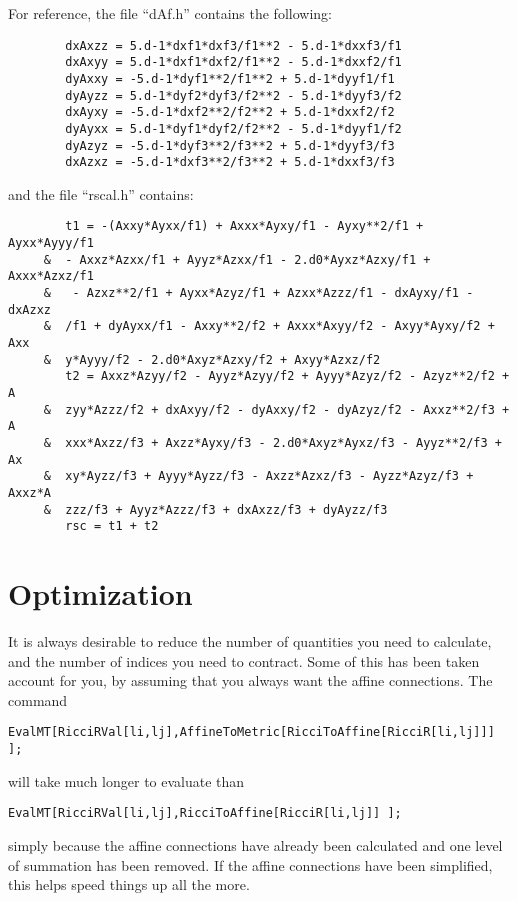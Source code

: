 For reference, the file ``dAf.h'' contains the following:
\begin{verbatim}
        dxAxzz = 5.d-1*dxf1*dxf3/f1**2 - 5.d-1*dxxf3/f1
        dxAxyy = 5.d-1*dxf1*dxf2/f1**2 - 5.d-1*dxxf2/f1
        dyAxxy = -5.d-1*dyf1**2/f1**2 + 5.d-1*dyyf1/f1
        dyAyzz = 5.d-1*dyf2*dyf3/f2**2 - 5.d-1*dyyf3/f2
        dxAyxy = -5.d-1*dxf2**2/f2**2 + 5.d-1*dxxf2/f2
        dyAyxx = 5.d-1*dyf1*dyf2/f2**2 - 5.d-1*dyyf1/f2
        dyAzyz = -5.d-1*dyf3**2/f3**2 + 5.d-1*dyyf3/f3
        dxAzxz = -5.d-1*dxf3**2/f3**2 + 5.d-1*dxxf3/f3
\end{verbatim}
and the file ``rscal.h'' contains:
\begin{verbatim}
        t1 = -(Axxy*Ayxx/f1) + Axxx*Ayxy/f1 - Ayxy**2/f1 + Ayxx*Ayyy/f1
     &  - Axxz*Azxx/f1 + Ayyz*Azxx/f1 - 2.d0*Ayxz*Azxy/f1 + Axxx*Azxz/f1
     &   - Azxz**2/f1 + Ayxx*Azyz/f1 + Azxx*Azzz/f1 - dxAyxy/f1 - dxAzxz
     &  /f1 + dyAyxx/f1 - Axxy**2/f2 + Axxx*Axyy/f2 - Axyy*Ayxy/f2 + Axx
     &  y*Ayyy/f2 - 2.d0*Axyz*Azxy/f2 + Axyy*Azxz/f2
        t2 = Axxz*Azyy/f2 - Ayyz*Azyy/f2 + Ayyy*Azyz/f2 - Azyz**2/f2 + A
     &  zyy*Azzz/f2 + dxAxyy/f2 - dyAxxy/f2 - dyAzyz/f2 - Axxz**2/f3 + A
     &  xxx*Axzz/f3 + Axzz*Ayxy/f3 - 2.d0*Axyz*Ayxz/f3 - Ayyz**2/f3 + Ax
     &  xy*Ayzz/f3 + Ayyy*Ayzz/f3 - Axzz*Azxz/f3 - Ayzz*Azyz/f3 + Axxz*A
     &  zzz/f3 + Ayyz*Azzz/f3 + dxAxzz/f3 + dyAyzz/f3
        rsc = t1 + t2
\end{verbatim}

\section{Optimization}

It is always desirable to reduce the number of quantities you need
to calculate, and the number of indices you need to contract.  Some
of this has been taken account for you, by assuming that you always
want the affine connections.  The command
\begin{verbatim}
EvalMT[RicciRVal[li,lj],AffineToMetric[RicciToAffine[RicciR[li,lj]]] ];
\end{verbatim}
will take much longer to evaluate than
\begin{verbatim}
EvalMT[RicciRVal[li,lj],RicciToAffine[RicciR[li,lj]] ];
\end{verbatim}
simply because the affine connections have already been calculated
and one level of summation has been removed.  If the affine connections
have been simplified, this helps speed things up all the more.

